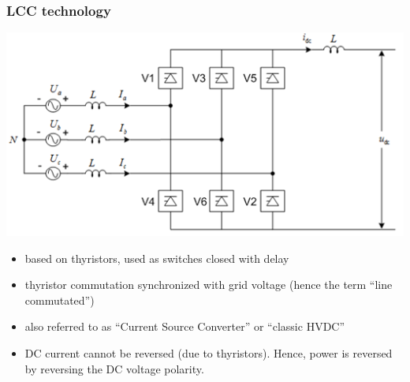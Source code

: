 \begin{frame}
\frametitle{LCC technology}
\begin{center}
    \includegraphics[width=0.4\linewidth]{images/lcc.png}
\end{center}
\begin{itemize}
    \item based on thyristors, used as switches closed with delay
    \item thyristor commutation synchronized with grid voltage (hence the term ``line commutated'')
    \item also referred to as ``Current Source Converter'' or ``classic HVDC''
    \item DC current cannot be reversed (due to thyristors). Hence, power is reversed by reversing the DC voltage polarity.
\end{itemize}
\end{frame}

